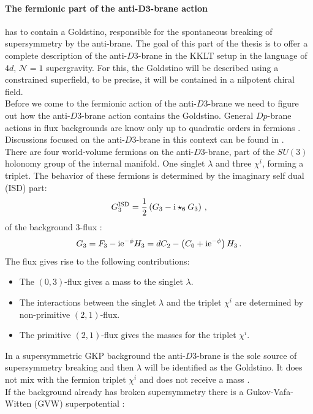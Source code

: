 \documentclass[a4paper,12pt]{report}
\newcommand{\be}{\begin{equation}}
\newcommand{\ee}{\end{equation}}
\def\rmi{{\rm i}}
\def\rme{{\rm e}}
\begin{document}
\paragraph{The fermionic part of the anti-$\mathbf{D3}$-brane action} has to contain a Goldstino, responsible for the spontaneous breaking of supersymmetry by the anti-brane. The goal of this part of the thesis is  to offer a complete description of the anti-$D3$-brane in the KKLT setup in the language of $4d$, $\mathcal{N}=1$ supergravity. For this, the Goldstino will be described using a constrained superfield, to be precise, it will be contained in a nilpotent chiral field. \\
Before we come to the fermionic action of the anti-$D3$-brane we need to figure out how the anti-$D3$-brane action contains the Goldstino. General $Dp$-brane actions in flux backgrounds are know only up to quadratic orders in fermions \cite{Grana:2002tu,Grana:2003ek,Marolf:2003ye,Tripathy:2005hv,Martucci:2005rb,Bergshoeff:2013pia}. Discussions focused on the anti-$D3$-brane in this context can be found in \cite{Kallosh:2014wsa,Bergshoeff:2015jxa,GarciadelMoral:2017vnz,McGuirk:2012sb}. \\
There are four world-volume fermions on the anti-$D3$-brane, part of the $SU(3)$ holonomy group of the internal manifold. One singlet $\lambda$ and three $\chi^i$, forming a triplet. The behavior of these fermions is determined by the imaginary  self dual (ISD) part:
\be 
G_3^{\text{ISD}} = \frac{1}{2} \left( G_3 - \rmi \star_6 G_3 \right)\,,
\ee
of the background 3-flux \cite{Bergshoeff:2015jxa,McGuirk:2012sb}:
\be 
G_3 = F_3 - \rmi \rme^{-\phi} H_3 = dC_2 - \left(C_0 + \rmi \rme^{-\phi} \right) H_3\,.
\ee
The flux gives rise to the following contributions:
\begin{itemize}
\item The $(0,3)$-flux gives a mass to the singlet $\lambda$.
\item The interactions between the singlet $\lambda$ and the triplet $\chi^i$ are determined by non-primitive $(2,1)$-flux.
\item The primitive $(2,1)$-flux gives the masses for the triplet $\chi^i$.
\end{itemize}
In a supersymmetric GKP background the anti-$D3$-brane is the sole source of supersymmetry breaking and then $\lambda$ will be identified as the Goldstino. It does not mix with the fermion triplet $\chi^i$ and does not receive a mass \cite{Bergshoeff:2015jxa}.\\
If the background already has broken supersymmetry there is a Gukov-Vafa-Witten (GVW) superpotential \cite{Gukov:1999ya}:
\end{document}
